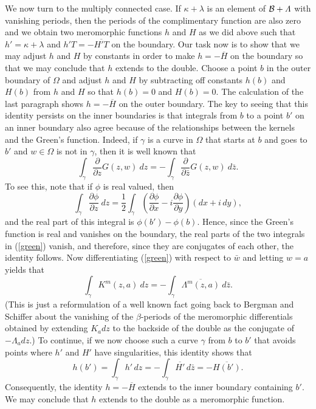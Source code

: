 \documentclass[12pt]{amsart}
\newcommand\dee{\partial}
\newcommand\Om{\Omega}
\numberwithin{equation}{section}
\begin{document}
We now turn to the multiply connected case.  If
$\kappa+\lambda$ is an element of
$\mathcal{B}+\mathnormal{\Lambda}$
with vanishing periods, then the periods of the complimentary
function are also zero and we obtain two meromorphic
functions $h$ and $H$ as we did above such that
$h'=\kappa+\lambda$ and $h'T=-\overline{H'T}$ on the boundary.
Our task now is to show that we may adjust $h$ and $H$ by
constants in order to make $h=-\overline{H}$ on the
boundary so that we may conclude that $h$ extends to the
double. Choose a point $b$ in the outer boundary of $\Om$
and adjust $h$ and $H$ by subtracting off constants
$h(b)$ and $H(b)$ from $h$ and $H$ so that $h(b)=0$ and
$H(b)=0$. The calculation of the last paragraph shows
$h=-\overline{H}$ on the outer boundary. The key to
seeing that this identity persists on the inner boundaries
is that integrals from $b$ to a point $b'$ on an
inner boundary also agree because of the relationships
between the kernels and the Green's function. Indeed,
if $\gamma$ is a curve in $\Om$ that starts at $b$
and goes to $b'$ and $w\in\Om$ is not in $\gamma$, then
it is well known that
\begin{equation}
\label{green}
\int_\gamma \frac{\dee}{\dee z}G(z,w)\ dz=
-\int_\gamma \frac{\dee}{\dee\bar z}G(z,w)\ d\bar z.
\end{equation}
To see this, note that if $\phi$ is real valued, then
$$\int_\gamma \frac{\dee\phi}{\dee z}\ dz =
\frac12\int_\gamma\left(\frac{\dee\phi}{\dee x}-i
\frac{\dee\phi}{\dee y}\right)(dx+i\,dy),$$
and the real part of this integral is $\phi(b')-\phi(b)$.
Hence, since the Green's function is real and vanishes on
the boundary, the real parts of the two integrals in
(\ref{green}) vanish, and therefore, since they are
conjugates of each other, the identity follows. Now
differentiating (\ref{green}) with respect to $\bar w$
and letting $w=a$ yields that
$$\int_\gamma K^m(z,a)\ dz=
-\int_\gamma \overline{\Lambda^m(z,a)}\ d\bar z.$$
(This is just a reformulation of a well known fact
going back to Bergman and Schiffer about the vanishing
of the $\beta$-periods of the meromorphic differentials
obtained by extending $K_a dz$ to the backside of the
double as the conjugate of $-\Lambda_a dz$.)
To continue, if we now choose such a curve $\gamma$ from $b$ to $b'$
that avoids points where $h'$ and $H'$ have singularities,
this identity shows that
$$h(b')=\int_{\gamma}h'\,dz=
-\int_{\gamma}\overline{H'}\,d\bar z=
-\overline{H(b')}.$$
Consequently, the identity $h=-\overline{H}$ extends
to the inner boundary containing $b'$. We may conclude
that $h$ extends to the double as a meromorphic function.
\end{document}
